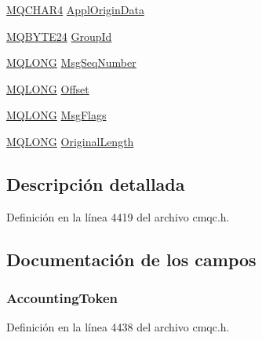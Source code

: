 \begin{DoxyCompactItemize}
\hyperlink{cmqc_8h_a12590e546ed66fda7cf21c1d5cefa31d}{M\+Q\+C\+H\+A\+R4} \hyperlink{structtag_m_q_m_d_aaf3c543f992b06c609193929872b998a}{Appl\+Origin\+Data}
\item 
\hyperlink{cmqc_8h_a2866d93c0ef84cfcda34cab5fd22fc5a}{M\+Q\+B\+Y\+T\+E24} \hyperlink{structtag_m_q_m_d_abcf7ab1abd1c768c0adb9acb3d09c6f1}{Group\+Id}
\item 
\hyperlink{cmqc_8h_a1fb8d28cbda3fa8766a9821230cdb6d5}{M\+Q\+L\+O\+N\+G} \hyperlink{structtag_m_q_m_d_a7c78a4f7c1bbda9f124f904e0d02a7a2}{Msg\+Seq\+Number}
\item 
\hyperlink{cmqc_8h_a1fb8d28cbda3fa8766a9821230cdb6d5}{M\+Q\+L\+O\+N\+G} \hyperlink{structtag_m_q_m_d_aac8433c970f16a602e3b79400e87d28b}{Offset}
\item 
\hyperlink{cmqc_8h_a1fb8d28cbda3fa8766a9821230cdb6d5}{M\+Q\+L\+O\+N\+G} \hyperlink{structtag_m_q_m_d_a10cb94bb1b2528f6ad936454455bb40a}{Msg\+Flags}
\item 
\hyperlink{cmqc_8h_a1fb8d28cbda3fa8766a9821230cdb6d5}{M\+Q\+L\+O\+N\+G} \hyperlink{structtag_m_q_m_d_acf39c0c6d2618f565cf8315c8775b5ae}{Original\+Length}
\end{DoxyCompactItemize}


\subsection{Descripción detallada}


Definición en la línea 4419 del archivo cmqc.\+h.



\subsection{Documentación de los campos}
\hypertarget{structtag_m_q_m_d_a1fe2835a002ec01b58d479509699dd2c}{}
\subsubsection[{Accounting\+Token}]{ Accounting\+Token}\label{structtag_m_q_m_d_a1fe2835a002ec01b58d479509699dd2c}


Definición en la línea 4438 del archivo cmqc.\+h.

\hypertarget{structtag_m_q_m_d_a1f16948c5ba6adfbb92776400030700e}{}
